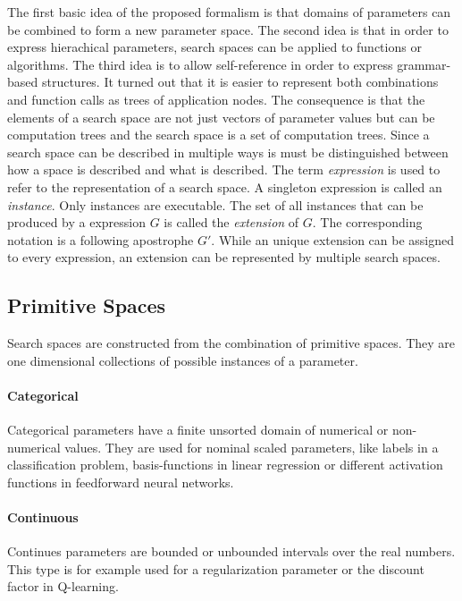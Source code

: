 \documentclass[english]{article}
\begin{document}
The first basic idea of the proposed formalism is that domains of parameters can be combined to form a new parameter space. The second idea is that in order to express hierachical parameters,
search spaces can be applied to functions or algorithms. The third idea is to allow self-reference in order to express grammar-based structures. It turned out that it is easier to represent both combinations and function calls as trees of application nodes.
The consequence is that the elements of a search space are not just vectors of parameter values but can be computation trees and the search space is a set of computation trees.
Since a search space can be described in multiple ways is must be distinguished between how a space is described and what is described. The term \textit{expression} is used to refer to the representation of a search space. A singleton expression is called an \textit{instance}. Only instances are executable. The set of all instances that can be produced by a expression $G$ is called the \textit{extension} of $G$. The corresponding notation is a following apostrophe $G'$. While an unique extension can be assigned to every expression, an extension can be represented by multiple search spaces.

\subsection{Primitive Spaces}

Search spaces are constructed from the combination of primitive spaces. They are one dimensional collections of possible instances of a parameter.


\paragraph{Categorical}
Categorical parameters have a finite unsorted domain of numerical or non-numerical values. They are used for nominal scaled parameters, like labels in a classification problem, basis-functions in linear regression or different activation functions in feedforward neural networks.

\paragraph{Continuous}
Continues parameters are bounded or unbounded intervals over the real numbers. This type is for example used for a regularization parameter or the discount factor in Q-learning.
\end{document}
